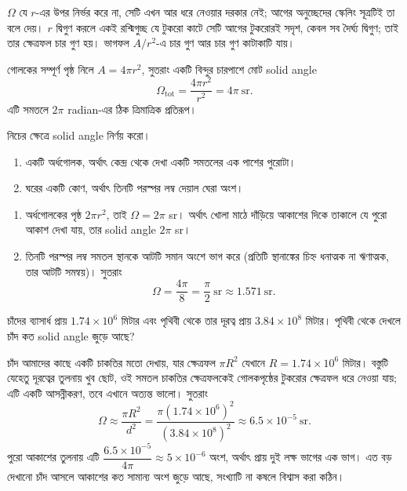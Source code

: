 \documentclass[11pt]{article}
\begin{document}
$\Omega$ যে $r$-এর উপর নির্ভর করে না, সেটি এখন আর ধরে নেওয়ার দরকার নেই; আগের
অনুচ্ছেদের স্কেলিং সূত্রটিই তা বলে দেয়। $r$ দ্বিগুণ করলে একই রশ্মিগুচ্ছ যে টুকরো
কাটে সেটি আগের টুকরোরই সদৃশ, কেবল সব দৈর্ঘ্য দ্বিগুণ; তাই তার ক্ষেত্রফল চার গুণ
হয়। ভাগফল $A/r^{2}$-এ চার গুণ আর চার গুণ কাটাকাটি যায়।

\begin{idea}
গোলকের সম্পূর্ণ পৃষ্ঠ নিলে $A = 4\pi r^{2}$, সুতরাং একটি বিন্দুর চারপাশে মোট
solid angle
\[
  \Omega_{\mathrm{tot}} = \frac{4\pi r^{2}}{r^{2}} = 4\pi \ \mathrm{sr} .
\]
এটি সমতলে $2\pi$ radian-এর ঠিক ত্রিমাত্রিক প্রতিরূপ।
\end{idea}

\begin{example}
নিচের ক্ষেত্রে solid angle নির্ণয় করো।
\begin{enumerate}
  \item একটি অর্ধগোলক, অর্থাৎ কেন্দ্র থেকে দেখা একটি সমতলের এক পাশের পুরোটা।
  \item ঘরের একটি কোণ, অর্থাৎ তিনটি পরস্পর লম্ব দেয়াল ঘেরা অংশ।
\end{enumerate}
\end{example}

\begin{solbox}
\begin{enumerate}
  \item অর্ধগোলকের পৃষ্ঠ $2\pi r^{2}$, তাই $\Omega = 2\pi$ sr। অর্থাৎ খোলা মাঠে
        দাঁড়িয়ে আকাশের দিকে তাকালে যে পুরো আকাশ দেখা যায়, তার solid angle
        $2\pi$ sr।
  \item তিনটি পরস্পর লম্ব সমতল স্থানকে আটটি সমান অংশে ভাগ করে (প্রতিটি
        স্থানাঙ্কের চিহ্ন ধনাত্মক না ঋণাত্মক, তার আটটি সমন্বয়)। সুতরাং
        \[
          \Omega = \frac{4\pi}{8} = \frac{\pi}{2} \ \mathrm{sr} \approx 1.571 \ \mathrm{sr}.
        \]
\end{enumerate}
\end{solbox}

\begin{example}
চাঁদের ব্যাসার্ধ প্রায় $1.74 \times 10^{6}$ মিটার এবং পৃথিবী থেকে তার দূরত্ব
প্রায় $3.84 \times 10^{8}$ মিটার। পৃথিবী থেকে দেখলে চাঁদ কত solid angle জুড়ে
আছে?
\end{example}

\begin{solbox}
চাঁদ আমাদের কাছে একটি চাকতির মতো দেখায়, যার ক্ষেত্রফল $\pi R^{2}$ যেখানে
$R = 1.74 \times 10^{6}$ মিটার। বস্তুটি যেহেতু দূরত্বের তুলনায় খুব ছোট, ওই সমতল
চাকতির ক্ষেত্রফলকেই গোলকপৃষ্ঠের টুকরোর ক্ষেত্রফল ধরে নেওয়া যায়; এটি একটি
আসন্নীকরণ, তবে এখানে অত্যন্ত ভালো। সুতরাং
\[
  \Omega \approx \frac{\pi R^{2}}{d^{2}}
  = \frac{\pi \left( 1.74 \times 10^{6} \right)^{2}}
         {\left( 3.84 \times 10^{8} \right)^{2}}
  \approx 6.5 \times 10^{-5} \ \mathrm{sr} .
\]
পুরো আকাশের তুলনায় এটি
$\dfrac{6.5 \times 10^{-5}}{4\pi} \approx 5 \times 10^{-6}$ অংশ, অর্থাৎ প্রায়
দুই লক্ষ ভাগের এক ভাগ। এত বড় দেখানো চাঁদ আসলে আকাশের কত সামান্য অংশ জুড়ে আছে,
সংখ্যাটি না কষলে বিশ্বাস করা কঠিন।
\end{solbox}
\end{document}
